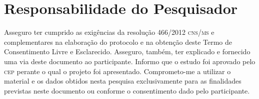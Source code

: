 \documentclass[a4paper,11pt,titlepage,singlespacing]{article}
\begin{document}
\section*{Responsabilidade do Pesquisador}

\noindent Asseguro ter cumprido as exigências da resolução 466/2012 \textsc{cns/ms} e complementares na elaboração do protocolo e na obtenção deste Termo de Consentimento Livre e Esclarecido. Asseguro, também, ter explicado e fornecido uma via deste documento ao participante. Informo que o estudo foi aprovado pelo \textsc{cep} perante o qual o projeto foi apresentado. Comprometo-me a utilizar o material e os dados obtidos nesta pesquisa exclusivamente para as finalidades previstas neste documento ou conforme o consentimento dado pelo participante.\\



\end{document}

